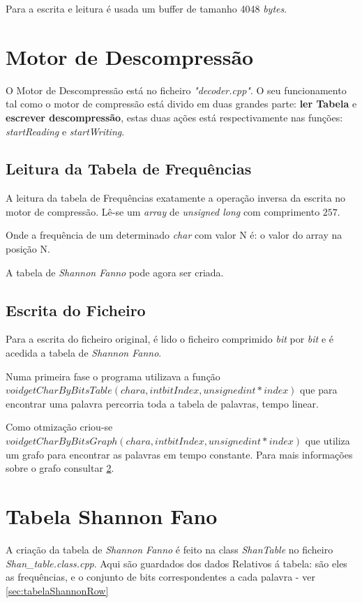 \documentclass[11pt,a4paper]{report}
\begin{document}
Para a escrita e leitura é usada um buffer de tamanho 4048 \textit{bytes}.
\newpage
\section{Motor de Descompressão}
O Motor de Descompressão está no ficheiro \textit{"decoder.cpp"}. O seu funcionamento tal como o motor de compressão está divido em duas grandes parte: \textbf{ler Tabela} e \textbf{escrever descompressão}, estas duas ações está respectivamente nas funções: \textit{startReading} e \textit{startWriting}. 


\subsection{Leitura da Tabela de Frequências}
A leitura da tabela de Frequências exatamente a operação inversa da escrita no motor de compressão. Lê-se um \textit{array} de \textit{unsigned long} com comprimento $257$.

Onde a frequência de um determinado \textit{char} com valor N é: o valor do array na posição N.

A tabela de \textit{Shannon Fanno} pode agora ser criada.

\subsection{Escrita do Ficheiro}
Para a escrita do ficheiro original, é lido o ficheiro comprimido \textit{bit} por \textit{bit} e é acedida a tabela de \textit{Shannon Fanno}.

Numa primeira fase o programa utilizava a função \textit{$void getCharByBitsTable(char a,int bitIndex, unsigned int * index)$} que para encontrar uma palavra percorria toda a tabela de palavras, tempo linear.

Como otmização criou-se \textit{$void getCharByBitsGraph(char a,int bitIndex, unsigned int * index)$} que utiliza um grafo para encontrar as palavras em tempo constante. Para mais informações sobre o grafo consultar \ref{sec:tabelaShannon}.

\newpage
\section{Tabela Shannon Fano}
\label{sec:tabelaShannon}

A criação da tabela de \textit{Shannon Fanno} é feito na class \textit{ShanTable} no ficheiro \textit{Shan\_table.class.cpp}. Aqui são guardados dos dados Relativos á tabela: são eles as frequências, e o conjunto de bits correspondentes a cada palavra - ver \ref{sec:tabelaShannonRow}
\end{document}

